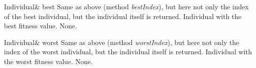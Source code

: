 \setNormalInstance
\printEmptyMethodReturnSpecial
{Individual\&}
{best}
{Same as above (method {\em bestIndex}), but here not only the index
 of the best individual, but the individual itself is returned.}
{Individual with the best fitness value.}
{None.}

\vspace*{4ex}

\setNormalInstance
\printEmptyMethodReturnSpecial
{Individual\&}
{worst}
{Same as above (method {\em worstIndex}), but here not only the index
 of the worst individual, but the individual itself is returned.}
{Individual with the worst fitness value.}
{None.}








